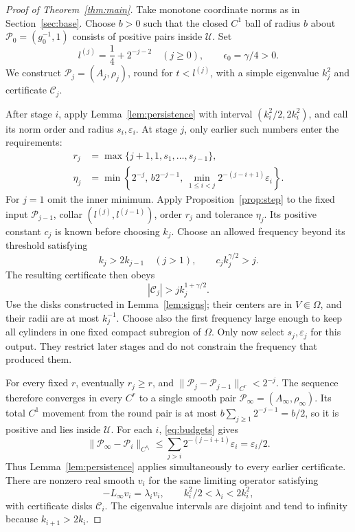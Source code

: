 \begin{proof}[Proof of Theorem~\ref{thm:main}]
Take monotone coordinate norms as in Section~\ref{sec:base}.
Choose \(b>0\) such that the closed \(C^1\) ball of radius \(b\)
about \(\mathcal P_0=(g_0^{-1},1)\) consists of positive pairs
inside \(\mathcal U\). Set
\[
 l^{(j)}=\frac14+2^{-j-2}\quad(j\ge0),\qquad
 \epsilon_0=\gamma/4>0 .
\]
We construct \(\mathcal P_j=(A_j,\rho_j)\), round for
\(t<l^{(j)}\), with a simple eigenvalue \(k_j^2\) and
certificate \(\mathcal C_j\).

After stage \(i\), apply Lemma~\ref{lem:persistence} with interval
\((k_i^2/2,2k_i^2)\), and call its norm order and radius
\(s_i,\varepsilon_i\). At stage \(j\), only earlier such
numbers enter the requirements:
\begin{equation}\label{eq:budgets}
 \begin{split}
 r_j&=\max\{j+1,1,s_1,\ldots,s_{j-1}\},\\
 \eta_j&=\min\left\{2^{-j},\,b2^{-j-1},\,
              \min_{1\le i<j}
                    2^{-(j-i+1)}\varepsilon_i\right\}.
 \end{split}
\end{equation}
For \(j=1\) omit the inner minimum. Apply
Proposition~\ref{prop:step} to the fixed input
\(\mathcal P_{j-1}\), collar
\((l^{(j)},l^{(j-1)})\), order \(r_j\) and tolerance \(\eta_j\).
Its positive constant \(c_j\) is known before choosing \(k_j\).
Choose an allowed frequency beyond its threshold satisfying
\[
 k_j>2k_{j-1}\quad(j>1),\qquad c_jk_j^{\gamma/2}>j.
\]
The resulting certificate then obeys
\begin{equation}\label{eq:stagesize}
 |\mathcal C_j|>j k_j^{1+\gamma/2}.
\end{equation}
Use the disks constructed in Lemma~\ref{lem:signs}; their centers
are in \(V\Subset\Omega\), and their radii are at most \(k_j^{-1}\).
Choose also the first frequency large enough to keep all cylinders
in one fixed compact subregion of \(\Omega\).
Only now select \(s_j,\varepsilon_j\) for this output.
They restrict later stages and do not constrain the frequency
that produced them.

For every fixed \(r\), eventually \(r_j\ge r\), and
\(\|\mathcal P_j-\mathcal P_{j-1}\|_{C^r}<2^{-j}\).
The sequence therefore converges in every \(C^r\) to a single
smooth pair \(\mathcal P_\infty=(A_\infty,\rho_\infty)\).
Its total \(C^1\) movement from the round pair is at most
\(b\sum_{j\ge1}2^{-j-1}=b/2\), so it is positive and lies
inside \(\mathcal U\).
For each \(i\), \eqref{eq:budgets} gives
\[
 \|\mathcal P_\infty-\mathcal P_i\|_{C^{s_i}}
 \le\sum_{j>i}2^{-(j-i+1)}\varepsilon_i
       =\varepsilon_i/2 .
\]
Thus Lemma~\ref{lem:persistence} applies simultaneously to every
earlier certificate. There are nonzero real smooth \(v_i\) for
the same limiting operator satisfying
\begin{equation}\label{eq:limitlambda}
 -L_\infty v_i=\lambda_i v_i,\qquad
 k_i^2/2<\lambda_i<2k_i^2,
\end{equation}
with certificate disks \(\mathcal C_i\).
The eigenvalue intervals are disjoint and tend to infinity
because \(k_{i+1}>2k_i\).


\end{proof}
